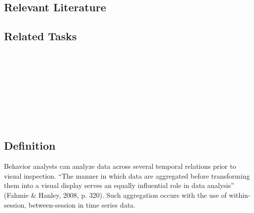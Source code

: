 \subsection{Relevant Literature}
\begin{refsection}
\nocite{test,alang2017police,clayton2018black}
\printbibliography[heading=none]
\end{refsection}
%
\subsection{Related Tasks}
\fouraTen{}\\
\fouraEleven{}\\
\fourhThree{}\\
\fourhFour{}\\
\fouriOne{}\\
\fouriFive{}\\
\fourFKFourtySeven{}\\%
%
%
%
%
%
%
\section[\fourhFive{}]{\fourhFive{}%
              }
\subsection{Definition}
Behavior analysts can analyze data across several temporal relations prior to visual inspection. ``The manner in which data are aggregated before transforming them into a visual display serves an equally influential role in data analysis'' (Fahmie \& Hanley, 2008, p. 320).  Such aggregation occurs with the use of within-session, between-session in time series data. 

